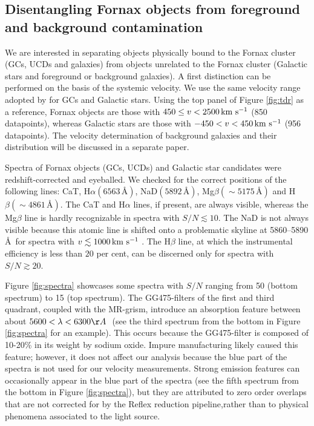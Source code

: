 \subsection{Disentangling Fornax objects from foreground and background 
contamination}

We are interested in separating objects physically bound to the Fornax cluster 
(GCs, UCDs and galaxies) from objects unrelated to the Fornax cluster (Galactic 
stars and foreground or background galaxies). A first distinction can be 
performed on the basis of the systemic velocity. We use the same velocity range 
adopted by \cite{Schuberth} for GCs and Galactic stars.
Using the top panel of Figure \ref{fig:tdr} as a reference, Fornax objects are 
those with $450 \le v <2500 \mbox{\,km~s$^{-1}$}$ (850 datapoints), whereas Galactic stars are 
those with $-450<v<450 \mbox{\,km~s$^{-1}$}$ (956 datapoints). The velocity determination of 
background galaxies and their distribution will be discussed in a separate 
paper.

Spectra of Fornax objects (GCs, UCDs) and Galactic star candidates were 
redshift-corrected and eyeballed. We checked for the correct positions of the 
following lines: CaT, H$\alpha (6563 \, \mbox{\AA})$, NaD$(5892 \, 
\mbox{\AA})$, Mg$\beta (\sim 5175 \, \mbox{\AA})$ and H$\beta (\sim 4861\, 
\mbox{\AA})$. The CaT and H$\alpha$ lines, if present, are always visible, 
whereas the Mg$\beta$ line is hardly recognizable in spectra with $S/N \lesssim 
10$. The NaD is not always visible because this atomic line is shifted onto a 
problematic skyline at 5860--5890 \AA\ for spectra with $v \lesssim 1000\mbox{\,km~s$^{-1}$}$ . 
The H$\beta$ line, at which the instrumental efficiency is less than $20$ per 
cent, can be discerned only for spectra with $S/N \gtrsim 20 $.

Figure \ref{fig:spectra} showcases some spectra with $S/N$ ranging from 50 
(bottom spectrum) to 15 (top spectrum). 
The GG475-filters of the first and third quadrant, coupled with the MR-grism, 
introduce an absorption feature between about $5600 < \lambda < 6300 \AA\ $ 
(see the third spectrum from the bottom in Figure \ref{fig:spectra} for an 
example). This occurs because the GG475-filter is composed of 10-20\% in its 
weight by sodium oxide. Impure manufacturing likely caused this feature; 
however, it does not affect our analysis because the blue part of the spectra 
is not used for our velocity measurements. Strong emission features can 
occasionally appear in the blue part of the spectra (see the fifth spectrum 
from the bottom in Figure \ref{fig:spectra}), but they are attributed to zero 
order overlaps that are not corrected for by the Reflex reduction 
pipeline,rather than to physical phenomena associated to the light source. 

